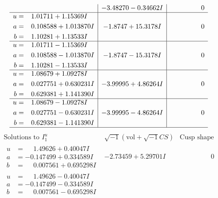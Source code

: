 \documentclass[1p]{elsarticle_modified}
\theoremstyle{definition}
\newcommand{\I}{\sqrt{-1}}
\begin{document}
$$\begin{array}{c|c|c}
 & -3.48270 - 0.34662 I & \phantom{-0.000000 } 0 \\ \hline\begin{aligned}
u &= \phantom{-}1.01711 + 1.15369 I \\
a &= \phantom{-}0.108588 + 1.013870 I \\
b &= \phantom{-}1.10281 + 1.13533 I\end{aligned}
 & -1.8747 + 15.3178 I & \phantom{-0.000000 } 0 \\ \hline\begin{aligned}
u &= \phantom{-}1.01711 - 1.15369 I \\
a &= \phantom{-}0.108588 - 1.013870 I \\
b &= \phantom{-}1.10281 - 1.13533 I\end{aligned}
 & -1.8747 - 15.3178 I & \phantom{-0.000000 } 0 \\ \hline\begin{aligned}
u &= \phantom{-}1.08679 + 1.09278 I \\
a &= \phantom{-}0.027751 + 0.630231 I \\
b &= \phantom{-}0.629381 + 1.141390 I\end{aligned}
 & -3.99995 + 4.86264 I & \phantom{-0.000000 } 0 \\ \hline\begin{aligned}
u &= \phantom{-}1.08679 - 1.09278 I \\
a &= \phantom{-}0.027751 - 0.630231 I \\
b &= \phantom{-}0.629381 - 1.141390 I\end{aligned}
 & -3.99995 - 4.86264 I & \phantom{-0.000000 } 0\\
 \hline 
 \end{array}$$\newpage$$\begin{array}{c|c|c}  
\text{Solutions to }I^u_{1}& \I (\text{vol} + \sqrt{-1}CS) & \text{Cusp shape}\\
 \hline 
\begin{aligned}
u &= \phantom{-}1.49626 + 0.40047 I \\
a &= -0.147499 + 0.334589 I \\
b &= \phantom{-}0.007561 + 0.695298 I\end{aligned}
 & -2.73459 + 5.29701 I & \phantom{-0.000000 } 0 \\ \hline\begin{aligned}
u &= \phantom{-}1.49626 - 0.40047 I \\
a &= -0.147499 - 0.334589 I \\
b &= \phantom{-}0.007561 - 0.695298 I\end{aligned}

\end{array}$$
\end{document}
